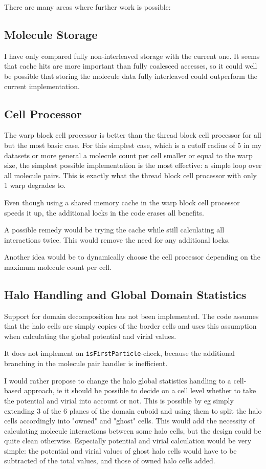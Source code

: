 There are many areas where further work is possible:

\subsection{Molecule Storage}
I have only compared fully non-interleaved storage with the current one. It seems that cache hits are more important than fully coalesced accesses, so it could well be possible that storing the molecule data fully interleaved could outperform the current implementation.

\subsection{Cell Processor}
The warp block cell processor is better than the thread block cell processor for all but the most basic case.
For this simplest case, which is a cutoff radius of 5 in my datasets or more general a molecule count per cell smaller or equal to the warp size, the simplest possible implementation is the most effective: a simple loop over all molecule pairs. This is exactly what the thread block cell processor with only 1 warp degrades to.

Even though using a shared memory cache in the warp block cell processor speeds it up, the additional locks in the code erases all benefits.

A possible remedy would be trying the cache while still calculating all interactions twice. This would remove the need for any additional locks.

Another idea would be to dynamically choose the cell processor depending on the maximum molecule count per cell.

\subsection{Halo Handling and Global Domain Statistics}
Support for domain decomposition has not been implemented. The code assumes that the halo cells are simply copies of the border cells and uses this assumption when calculating the global potential and virial values.

It does not implement an \lstinline!isFirstParticle!-check, because the additional branching in the molecule pair handler is inefficient.

I would rather propose to change the halo global statistics handling to a cell-based approach, ie it should be possible to decide on a cell level whether to take the potential and virial into account or not.
This is possible by eg simply extending 3 of the 6 planes of the domain cuboid and using them to split the halo cells accordingly into "owned" and "ghost" cells. This would add the necessity of calculating molecule interactions between some halo cells, but the design could be quite clean otherwise. Especially potential and virial calculation would be very simple: the potential and virial values of ghost halo cells would have to be subtracted of the total values, and those of owned halo cells added.

